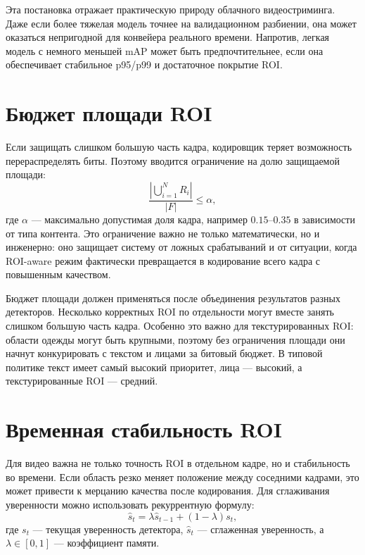 \documentclass[12pt,a4paper,oneside,openany]{report}
\begin{document}
Эта постановка отражает практическую природу облачного видеостриминга. Даже если более тяжелая модель точнее на валидационном разбиении, она может оказаться непригодной для конвейера реального времени. Напротив, легкая модель с немного меньшей mAP может быть предпочтительнее, если она обеспечивает стабильное p95/p99 и достаточное покрытие ROI.

\section{Бюджет площади ROI}

Если защищать слишком большую часть кадра, кодировщик теряет возможность перераспределять биты. Поэтому вводится ограничение на долю защищаемой площади:
\begin{equation}\frac{\left|\bigcup_{i=1}^{N} R_i\right|}{|F|} \leq \alpha,\label{eq:area_budget}
\end{equation}где $\alpha$ --- максимально допустимая доля кадра, например $0.15$--$0.35$ в зависимости от типа контента. Это ограничение важно не только математически, но и инженерно: оно защищает систему от ложных срабатываний и от ситуации, когда ROI-aware режим фактически превращается в кодирование всего кадра с повышенным качеством.

Бюджет площади должен применяться после объединения результатов разных детекторов. Несколько корректных ROI по отдельности могут вместе занять слишком большую часть кадра. Особенно это важно для текстурированных ROI: области одежды могут быть крупными, поэтому без ограничения площади они начнут конкурировать с текстом и лицами за битовый бюджет. В типовой политике текст имеет самый высокий приоритет, лица --- высокий, а текстурированные ROI --- средний.

\section{Временная стабильность ROI}

Для видео важна не только точность ROI в отдельном кадре, но и стабильность во времени. Если область резко меняет положение между соседними кадрами, это может привести к мерцанию качества после кодирования. Для сглаживания уверенности можно использовать рекуррентную формулу:
\begin{equation}\hat{s}_{t} =\lambda \hat{s}_{t-1}+(1-\lambda)s_t,\label{eq:smoothing}
\end{equation}где $s_t$ --- текущая уверенность детектора, $\hat{s}_t$ --- сглаженная уверенность, а $\lambda \in [0,1]$ --- коэффициент памяти.
\end{document}
